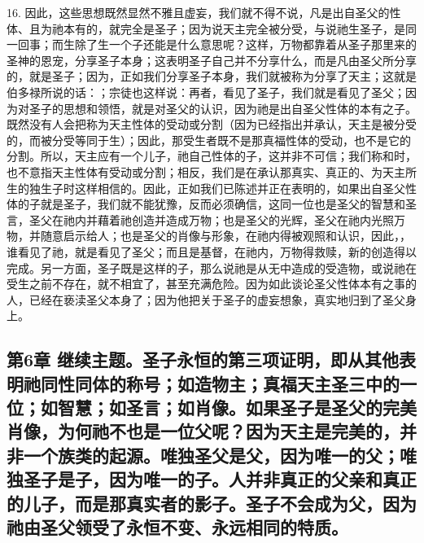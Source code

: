 16. 因此，这些思想既然显然不雅且虚妄，我们就不得不说，凡是出自圣父的性体、且为祂本有的，就完全是圣子；因为说天主完全被分受，与说祂生圣子，是同一回事；而生除了生一个子还能是什么意思呢？这样，万物都靠着从圣子那里来的圣神的恩宠，分享圣子本身；这表明圣子自己并不分享什么，而是凡由圣父所分享的，就是圣子；因为，正如我们分享圣子本身，我们就被称为分享了天主；这就是伯多禄所说的话：；宗徒也这样说：再者，看见了圣子，我们就是看见了圣父；因为对圣子的思想和领悟，就是对圣父的认识，因为祂是出自圣父性体的本有之子。既然没有人会把称为天主性体的受动或分割（因为已经指出并承认，天主是被分受的，而被分受等同于生）；因此，那受生者既不是那真福性体的受动，也不是它的分割。所以，天主应有一个儿子，祂自己性体的子，这并非不可信；我们称和时，也不意指天主性体有受动或分割；相反，我们是在承认那真实、真正的、为天主所生的独生子时这样相信的。因此，正如我们已陈述并正在表明的，如果出自圣父性体的子就是圣子，我们就不能犹豫，反而必须确信，这同一位也是圣父的智慧和圣言，圣父在祂内并藉着祂创造并造成万物；也是圣父的光辉，圣父在祂内光照万物，并随意启示给人；也是圣父的肖像与形象，在祂内得被观照和认识，因此，，谁看见了祂，就是看见了圣父；而且是基督，在祂内，万物得救赎，新的创造得以完成。另一方面，圣子既是这样的子，那么说祂是从无中造成的受造物，或说祂在受生之前不存在，就不相宜了，甚至充满危险。因为如此谈论圣父性体本有之事的人，已经在亵渎圣父本身了；因为他把关于圣子的虚妄想象，真实地归到了圣父身上。\par


\subsection{第6章 继续主题。圣子永恒的第三项证明，即从其他表明祂同性同体的称号；如造物主；真福天主圣三中的一位；如智慧；如圣言；如肖像。如果圣子是圣父的完美肖像，为何祂不也是一位父呢？因为天主是完美的，并非一个族类的起源。唯独圣父是父，因为唯一的父；唯独圣子是子，因为唯一的子。人并非真正的父亲和真正的儿子，而是那真实者的影子。圣子不会成为父，因为祂由圣父领受了永恒不变、永远相同的特质。}

